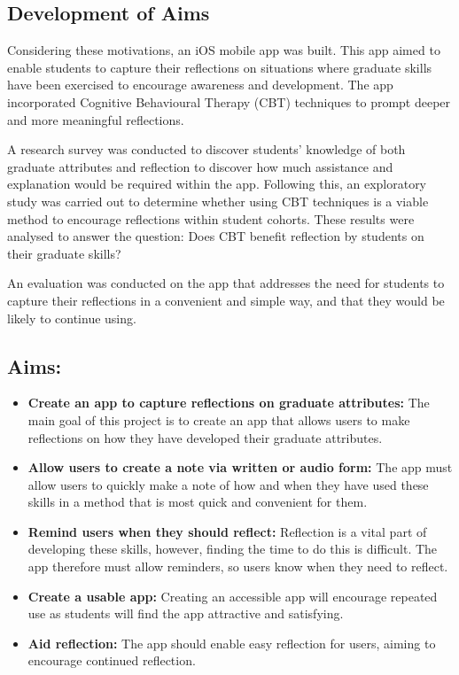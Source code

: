 \documentclass{l4proj}
\begin{document}
\subsection{Development of Aims}

Considering these motivations, an iOS mobile app was built.  This app aimed to enable students to capture their reflections on situations where graduate skills have been exercised to encourage awareness and development. The app incorporated Cognitive Behavioural Therapy (CBT) techniques to prompt deeper and more meaningful reflections. 

A research survey was conducted to discover students' knowledge of both graduate attributes and reflection to discover how much assistance and explanation would be required within the app. Following this, an exploratory study was carried out to determine whether using CBT techniques is a viable method to encourage reflections within student cohorts. These results were analysed to answer the question: Does CBT benefit reflection by students on their graduate skills?

An evaluation was conducted on the app that addresses the need for students to capture their reflections in a convenient and simple way, and that they would be likely to continue using.

\subsection{Aims:}

\begin{itemize}
    \item \textbf{Create an app to capture reflections on graduate attributes:} The main goal of this project is to create an app that allows users to make reflections on how they have developed their graduate attributes.
    \item \textbf{Allow users to create a note via written or audio form:} The app must allow users to quickly make a note of how and when they have used these skills in a method that is most quick and convenient for them.
    \item \textbf{Remind users when they should reflect:} Reflection is a vital part of developing these skills, however, finding the time to do this is difficult. The app therefore must allow reminders, so users know when they need to reflect.
    \item \textbf{Create a usable app:} Creating an accessible app will encourage repeated use as students will find the app attractive and satisfying.
    \item \textbf{Aid reflection:} The app should enable easy reflection for users, aiming to encourage continued reflection.
\end{itemize}
\end{document}
